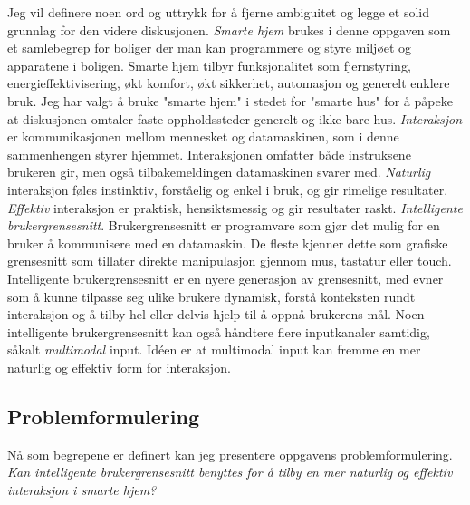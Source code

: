 Jeg vil definere noen ord og uttrykk for å fjerne ambiguitet og legge et solid grunnlag for den videre diskusjonen.
\newline\newline
\emph{Smarte hjem} brukes i denne oppgaven som et samlebegrep for boliger der man kan programmere og styre miljøet og apparatene i boligen. Smarte hjem tilbyr funksjonalitet som fjernstyring, energieffektivisering, økt komfort, økt sikkerhet, automasjon og generelt enklere bruk. Jeg har valgt å bruke "smarte hjem" i stedet for "smarte hus" for å påpeke at diskusjonen omtaler faste oppholdssteder generelt og ikke bare hus. 
\newline\newline
\emph{Interaksjon} er kommunikasjonen mellom mennesket og datamaskinen, som i denne sammenhengen styrer hjemmet. Interaksjonen omfatter både instruksene brukeren gir, men også tilbakemeldingen datamaskinen svarer med.
\newline\newline
\emph{Naturlig} interaksjon føles instinktiv, forståelig og enkel i bruk, og gir rimelige resultater.
\newline\newline
\emph{Effektiv} interaksjon er praktisk, hensiktsmessig og gir resultater raskt.
\newline\newline
\emph{Intelligente brukergrensesnitt}. Brukergrensesnitt er programvare som gjør det mulig for en bruker å kommunisere med en datamaskin. De fleste kjenner dette som grafiske grensesnitt som tillater direkte manipulasjon gjennom mus, tastatur eller touch. Intelligente brukergrensesnitt er en nyere generasjon av grensesnitt, med evner som å kunne tilpasse seg ulike brukere dynamisk, forstå konteksten rundt interaksjon og å tilby hel eller delvis hjelp til å oppnå brukerens mål. Noen intelligente brukergrensesnitt kan også håndtere flere inputkanaler samtidig, såkalt \emph{multimodal} input. Idéen er at multimodal input kan fremme en mer naturlig og effektiv form for interaksjon.

\subsection*{Problemformulering}
Nå som begrepene er definert kan jeg presentere oppgavens problemformulering.
\newline\newline
\emph{Kan intelligente brukergrensesnitt benyttes for å tilby en mer naturlig og effektiv interaksjon i smarte hjem?}


